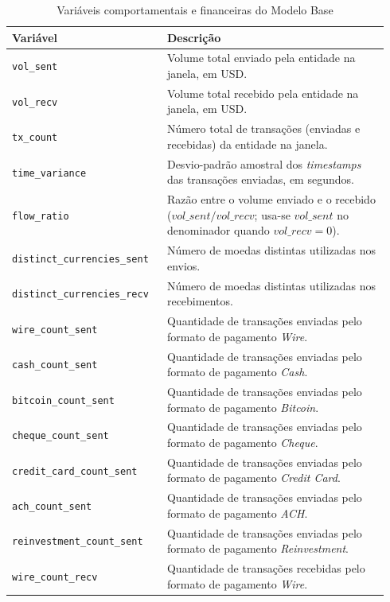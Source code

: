 \documentclass[titlepage,a4paper,oneside,onecolumn,12pt]{report}
\begin{document}
\begin{table}[htbp]
    \centering
    \caption{Variáveis comportamentais e financeiras do Modelo Base}
    \label{tab:behavioral-features}
    \begin{tabular}{p{0.38\linewidth}p{0.56\linewidth}}
        \hline
        \textbf{Variável} & \textbf{Descrição} \\
        \hline
        \texttt{vol\_sent} & Volume total enviado pela entidade na janela, em USD. \\
        \texttt{vol\_recv} & Volume total recebido pela entidade na janela, em USD. \\
        \texttt{tx\_count} & Número total de transações (enviadas e recebidas) da entidade na janela. \\
        \texttt{time\_variance} & Desvio-padrão amostral dos \textit{timestamps} das transações enviadas, em segundos. \\
        \texttt{flow\_ratio} & Razão entre o volume enviado e o recebido ($vol\_sent / vol\_recv$; usa-se $vol\_sent$ no denominador quando $vol\_recv = 0$). \\
        \texttt{distinct\_currencies\_sent} & Número de moedas distintas utilizadas nos envios. \\
        \texttt{distinct\_currencies\_recv} & Número de moedas distintas utilizadas nos recebimentos. \\
        \texttt{wire\_count\_sent} & Quantidade de transações enviadas pelo formato de pagamento \textit{Wire}. \\
        \texttt{cash\_count\_sent} & Quantidade de transações enviadas pelo formato de pagamento \textit{Cash}. \\
        \texttt{bitcoin\_count\_sent} & Quantidade de transações enviadas pelo formato de pagamento \textit{Bitcoin}. \\
        \texttt{cheque\_count\_sent} & Quantidade de transações enviadas pelo formato de pagamento \textit{Cheque}. \\
        \texttt{credit\_card\_count\_sent} & Quantidade de transações enviadas pelo formato de pagamento \textit{Credit Card}. \\
        \texttt{ach\_count\_sent} & Quantidade de transações enviadas pelo formato de pagamento \textit{ACH}. \\
        \texttt{reinvestment\_count\_sent} & Quantidade de transações enviadas pelo formato de pagamento \textit{Reinvestment}. \\
        \texttt{wire\_count\_recv} & Quantidade de transações recebidas pelo formato de pagamento \textit{Wire}. \\

\end{tabular}
\end{table}
\end{document}
